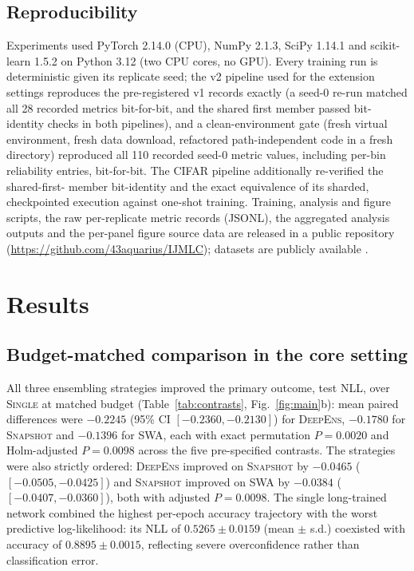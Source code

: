 \documentclass[11pt,a4paper]{article}
\newcommand{\deepens}{\textsc{DeepEns}}
\newcommand{\snapshot}{\textsc{Snapshot}}
\newcommand{\swa}{\textsc{SWA}}
\newcommand{\single}{\textsc{Single}}
\begin{document}
\subsection{Reproducibility}\label{sec:repro}

Experiments used PyTorch 2.14.0 (CPU), NumPy 2.1.3, SciPy 1.14.1 and
scikit-learn 1.5.2 on Python 3.12 (two CPU cores, no GPU). Every training
run is deterministic given its replicate seed; the v2 pipeline used for the
extension settings reproduces the pre-registered v1 records exactly (a
seed-0 re-run matched all 28 recorded metrics bit-for-bit, and the shared
first member passed bit-identity checks in both pipelines), and a
clean-environment gate (fresh virtual environment, fresh data download,
refactored path-independent code in a fresh directory) reproduced all 110
recorded seed-0 metric values, including per-bin reliability entries,
bit-for-bit. The CIFAR pipeline additionally re-verified the shared-first-
member bit-identity and the exact equivalence of its sharded, checkpointed
execution against one-shot training. Training, analysis and figure
scripts, the raw per-replicate metric records (JSONL), the aggregated
analysis outputs and the per-panel figure source data are released in a
public repository
(\url{https://github.com/43aquarius/IJMLC}); datasets are publicly
available \citep{xiao2017,lecun1998,clanuwat2018,krizhevsky2009}.

\section{Results}\label{sec:results}

\subsection{Budget-matched comparison in the core setting}
\label{sec:results-main}

All three ensembling strategies improved the primary outcome, test NLL,
over \single{} at matched budget (Table~\ref{tab:contrasts},
Fig.~\ref{fig:main}b): mean paired differences were $-0.2245$ (95\% CI
$[-0.2360,-0.2130]$) for \deepens{}, $-0.1780$ for \snapshot{} and
$-0.1396$ for \swa{}, each with exact permutation $P=0.0020$ and
Holm-adjusted $P=0.0098$ across the five pre-specified contrasts. The
strategies were also strictly ordered: \deepens{} improved on \snapshot{}
by $-0.0465$ ($[-0.0505,-0.0425]$) and \snapshot{} improved on \swa{} by
$-0.0384$ ($[-0.0407,-0.0360]$), both with adjusted $P=0.0098$. The
single long-trained network combined the highest per-epoch accuracy
trajectory with the worst predictive log-likelihood: its NLL of $0.5265
\pm 0.0159$ (mean $\pm$ s.d.) coexisted with accuracy of $0.8895 \pm
0.0015$, reflecting severe overconfidence rather than classification
error.
\end{document}
